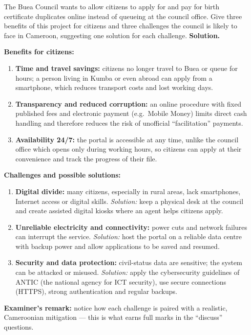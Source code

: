 \documentclass[11pt]{article}
\begin{document}
\begin{exoresolu}
The Buea Council wants to allow citizens to apply for and pay for birth certificate duplicates online instead of queueing at the council office. Give three benefits of this project for citizens and three challenges the council is likely to face in Cameroon, suggesting one solution for each challenge.
\tcblower
\textbf{Solution.}

\textbf{Benefits for citizens:}
\begin{enumerate}
\item \textbf{Time and travel savings:} citizens no longer travel to Buea or queue for hours; a person living in Kumba or even abroad can apply from a smartphone, which reduces transport costs and lost working days.
\item \textbf{Transparency and reduced corruption:} an online procedure with fixed published fees and electronic payment (e.g.\ Mobile Money) limits direct cash handling and therefore reduces the risk of unofficial ``facilitation'' payments.
\item \textbf{Availability 24/7:} the portal is accessible at any time, unlike the council office which opens only during working hours, so citizens can apply at their convenience and track the progress of their file.
\end{enumerate}

\textbf{Challenges and possible solutions:}
\begin{enumerate}
\item \textbf{Digital divide:} many citizens, especially in rural areas, lack smartphones, Internet access or digital skills. \emph{Solution:} keep a physical desk at the council and create assisted digital kiosks where an agent helps citizens apply.
\item \textbf{Unreliable electricity and connectivity:} power cuts and network failures can interrupt the service. \emph{Solution:} host the portal on a reliable data centre with backup power and allow applications to be saved and resumed.
\item \textbf{Security and data protection:} civil-status data are sensitive; the system can be attacked or misused. \emph{Solution:} apply the cybersecurity guidelines of ANTIC (the national agency for ICT security), use secure connections (HTTPS), strong authentication and regular backups.
\end{enumerate}
\textbf{Examiner's remark:} notice how each challenge is paired with a realistic, Cameroonian mitigation — this is what earns full marks in the ``discuss'' questions.
\end{exoresolu}
\end{document}

